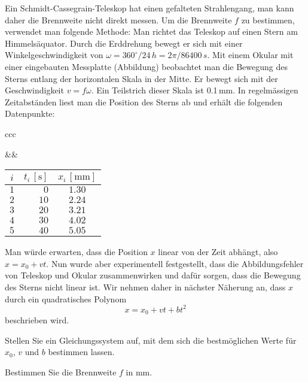 Ein Schmidt-Cassegrain-Teleskop hat einen gefalteten Strahlengang,
man kann daher die Brennweite nicht direkt messen.
Um die Brennweite $f$ zu bestimmen, verwendet man folgende Methode:
Man richtet das Teleskop auf einen Stern am Himmelsäquator.
Durch die Erddrehung bewegt
er sich mit einer Winkelgeschwindigkeit von
$\omega=360^\circ/24\,h=2\pi/86400\,s$.
Mit einem Okular mit einer eingebauten Messplatte (Abbildung)
beobachtet man die Bewegung des Sterns entlang der horizontalen Skala
in der Mitte.
Er bewegt sich mit der Geschwindigkeit $v = f\omega$.
Ein Teilstrich dieser Skala ist 0.1\,mm.
In regelmässigen Zeitabständen liest man die Position des Sterns ab
und erhält die folgenden Datenpunkte:
\begin{center}
\begin{tabular}{ccc}
\begin{minipage}{0.25\hsize}
\end{minipage}&\qquad\qquad\qquad&
\begin{minipage}{0.2\hsize}
\begin{tabular}{>{$}c<{$}|>{$}r<{$}|>{$}c<{$}}
i& t_i\,[\text{s}]&x_i\,[\text{mm}]\\
\hline
1& 0&1.30\\
2&10&2.24\\
3&20&3.21\\
4&30&4.02\\
5&40&5.05
\end{tabular}
\end{minipage}
\end{tabular}
\end{center}
Man würde erwarten, dass die Position $x$ linear von der Zeit abhängt,
also $x=x_0 + vt$.
Nun wurde aber experimentell festgestellt, dass die Abbildungsfehler
von Teleskop und Okular zusammenwirken und dafür sorgen, dass die
Bewegung des Sterns nicht linear ist.
Wir nehmen daher in nächster Näherung an, dass $x$ durch ein
quadratisches Polynom
\begin{equation}
x=x_0+vt + bt^2
\label{40000058:quadratisch}
\end{equation}
beschrieben wird.

\begin{teilaufgaben}
\item
Stellen Sie ein Gleichungssystem auf, mit dem sich die bestmöglichen
Werte für $x_0$, $v$ und $b$ bestimmen lassen.
\item
Bestimmen Sie die Brennweite $f$ in mm.
\end{teilaufgaben}

